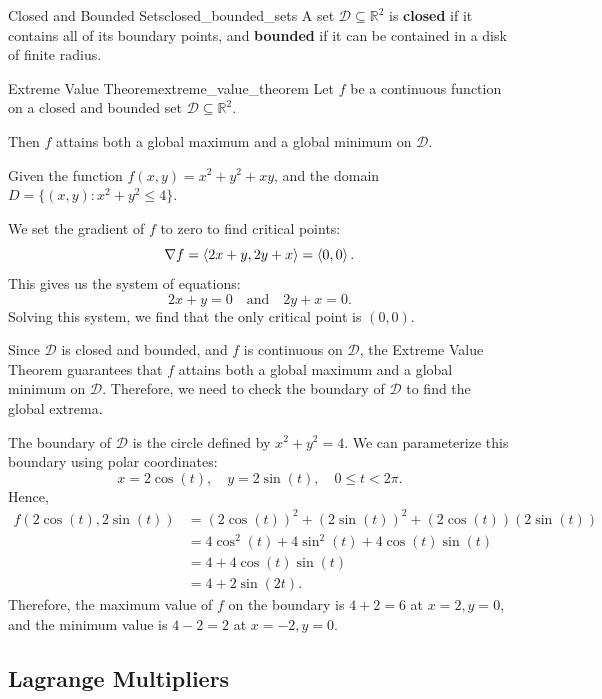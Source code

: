 \begin{definition}{Closed and Bounded Sets}{closed_bounded_sets}
A set $\mathcal{D} \subseteq \mathbb{R}^2$ is \textbf{closed} if it contains all of its boundary points,
and \textbf{bounded} if it can be contained in a disk of finite radius.
\end{definition}

\begin{theorem}{Extreme Value Theorem}{extreme_value_theorem}
Let $f$ be a continuous function on a closed and bounded set $\mathcal{D} \subseteq \mathbb{R}^2$.

Then $f$ attains both a global maximum and a global minimum on $\mathcal{D}$.
\end{theorem}

\begin{example}
Given the function $f(x, y) = x^2 + y^2 + xy$, and the domain $D = \{(x, y) : x^2 + y^2 \leq 4\}$.

We set the gradient of $f$ to zero to find critical points:
\[
\nabla f = \left\langle 2x + y, 2y + x \right\rangle = \left\langle 0, 0 \right\rangle.
\]
This gives us the system of equations:
\[
2x + y = 0 \quad \text{and} \quad 2y + x = 0.
\]
Solving this system, we find that the only critical point is $(0, 0)$.

Since $\mathcal{D}$ is closed and bounded, and $f$ is continuous on $\mathcal{D}$, the Extreme Value Theorem guarantees that $f$ attains both a global maximum and a global minimum on $\mathcal{D}$.
Therefore, we need to check the boundary of $\mathcal{D}$ to find the global extrema.

The boundary of $\mathcal{D}$ is the circle defined by $x^2 + y^2 = 4$. We can parameterize this boundary using polar coordinates:
\[
x = 2\cos(t), \quad y = 2\sin(t), \quad 0 \leq t < 2\pi.
\]
Hence,
\begin{align*}
f(2\cos(t), 2\sin(t)) &= (2\cos(t))^2 + (2\sin(t))^2 + (2\cos(t))(2\sin(t)) \\
&= 4\cos^2(t) + 4\sin^2(t) + 4\cos(t)\sin(t) \\
&= 4 + 4\cos(t)\sin(t) \\
&= 4 + 2\sin(2t).
\end{align*}
Therefore, the maximum value of $f$ on the boundary is $4 + 2 = 6$ at $x = 2, y = 0$, and the minimum value is $4 - 2 = 2$ at $x = -2, y = 0$.
\end{example}

\subsection{Lagrange Multipliers}

